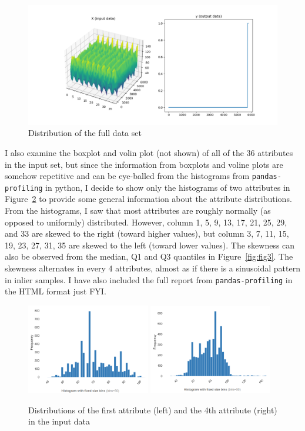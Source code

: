 \documentclass[12pt]{article}
\begin{document}
\begin{figure}[!ht]
\centering
\includegraphics[width=\textwidth]{fullDataSet_mesh}
\caption{Distribution of the full data set}
\label{fig:fig1}
\end{figure}

\vspace{0.5ex}
I also examine the boxplot and volin plot (not shown) of all of the 36 attributes in the input set, but since 
the information from boxplots and voline plots are somehow repetitive and can be eye-balled from the histograms from
\texttt{pandas-profiling} in python, I decide to show only the histograms of two attributes in Figure~\ref{fig:fig2}
to provide some general information about the attribute distributions. From the histograms, I saw that most attributes
are roughly normally (as opposed to uniformly) distributed.
However, column 1, 5, 9, 13, 17, 21, 25, 29, and 33 are skewed to the right (toward higher values), but 
column 3, 7, 11, 15, 19, 23, 27, 31, 35 are skewed to the left (toward lower values).
The skewness can also be observed from the median, Q1 and Q3 quantiles in Figure~\ref{fig:fig3}.
The skewness alternates in every 4 attributes, almost as if there is a sinusoidal pattern in inlier samples.
I have also included the full report from \texttt{pandas-profiling} in the HTML format just FYI.

\begin{figure}[ht!]
\centering
\includegraphics[width=0.48\textwidth]{boxplotAttribute1}
\includegraphics[width=0.48\textwidth]{boxplotAttribute4}
\caption{Distributions of the first attribute (left) and the 4th attribute (right) in the input data}
\label{fig:fig2}
\end{figure}
\end{document}
